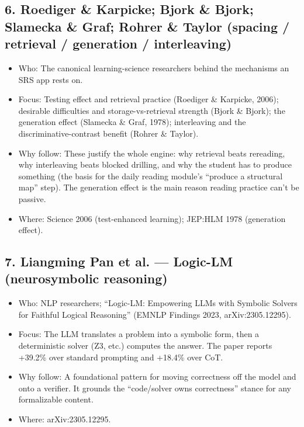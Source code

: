 \documentclass[11pt]{article}
\begin{document}
\subsection*{6. Roediger \& Karpicke; Bjork \& Bjork; Slamecka \& Graf; Rohrer \& Taylor (spacing / retrieval / generation / interleaving)}
\begin{itemize}
\item Who: The canonical learning-science researchers behind the mechanisms an SRS app rests on.
\item Focus: Testing effect and retrieval practice (Roediger \& Karpicke, 2006); desirable difficulties and storage-vs-retrieval strength (Bjork \& Bjork); the generation effect (Slamecka \& Graf, 1978); interleaving and the discriminative-contrast benefit (Rohrer \& Taylor).
\item Why follow: These justify the whole engine: why retrieval beats rereading, why interleaving beats blocked drilling, and why the student has to produce something (the basis for the daily reading module's \enquote{produce a structural map} step). The generation effect is the main reason reading practice can't be passive.
\item Where: Science 2006 (test-enhanced learning); JEP:HLM 1978 (generation effect).
\end{itemize}

\subsection*{7. Liangming Pan et al. --- Logic-LM (neurosymbolic reasoning)}
\begin{itemize}
\item Who: NLP researchers; \enquote{Logic-LM: Empowering LLMs with Symbolic Solvers for Faithful Logical Reasoning} (EMNLP Findings 2023, arXiv:2305.12295).
\item Focus: The LLM translates a problem into a symbolic form, then a deterministic solver (Z3, etc.) computes the answer. The paper reports +39.2\% over standard prompting and +18.4\% over CoT.
\item Why follow: A foundational pattern for moving correctness off the model and onto a verifier. It grounds the \enquote{code/solver owns correctness} stance for any formalizable content.
\item Where: arXiv:2305.12295.
\end{itemize}
\end{document}
